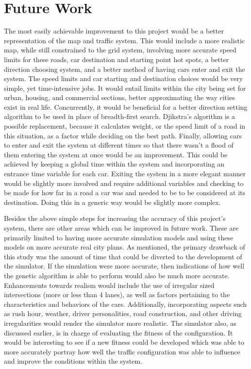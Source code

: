 \section{Future Work}
The most easily achievable improvement to this project would be a better representation of the map and traffic system.  This would include a more realistic map, while still constrained to the grid system, involving more accurate speed limits for these roads, car destination and starting point hot spots, a better direction choosing system, and a better method of having cars enter and exit the system.  The speed limits and car starting and destination choices would be very simple, yet time-intensive jobs.  It would entail limits within the city being set for urban, housing, and commercial sections,  better approximating the way cities exist in real life.  Concurrently, it would be beneficial for a better direction setting algorithm to be used in place of breadth-first search.  Djikstra's algorithm is a possible replacement, because it calculates weight, or the speed limit of a road in this situation, as a factor while deciding on the best path.  Finally, allowing cars to enter and exit the system at different times so that there wasn't a flood of them entering the system at once would be an improvement.  This could be achieved by keeping a global time within the system and incorporating an entrance time variable for each car.   Exiting the system in a more elegant manner would be slightly more involved and require additional variables and checking to be made for how far in a road a car was and needed to be to be considered at its destination.  Doing this in a generic way would be slightly more complex.

Besides the above simple steps for increasing the accuracy of this project's system, there are other areas which can be improved in future work.  These are primarily limited to having more accurate simulation models and using these models on more accurate real city plans.  As mentioned, the primary drawback of this study was the amount of time that could be diverted to the development of the simulator.  If the simulation were more accurate, then indications of how well the genetic algorithm is able to perform would also be much more accurate.  Enhancements towards realism would include the use of irregular sized intersections (more or less than 4 lanes), as well as factors pertaining to the characteristics and behaviors of the cars.  Additionally, incorporating aspects such as rush hour, weather, driver personalities, road construction, and other driving irregularities would render the simulator more realistic.  The simulator also, as discussed earlier, is in charge of evaluating the fitness of the configuration.  It would be interesting to see if a new fitness could be developed which was able to more accurately portray how well the traffic configuration was able to influence and improve the conditions within the system.  

